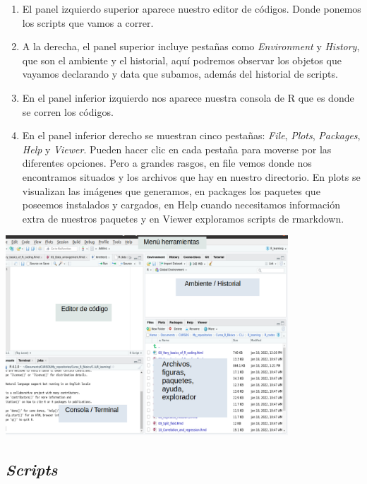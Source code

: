 \documentclass[
]{book}
\begin{document}
\begin{enumerate}
\def\labelenumi{\arabic{enumi}.}
\item
  El panel izquierdo superior aparece nuestro editor de códigos.
  Donde ponemos los scripts que vamos a correr.
\item
  A la derecha, el panel superior incluye pestañas como \emph{Environment} y \emph{History}, que son el ambiente y el historial, aquí podremos observar los objetos que vayamos declarando y data que subamos, además del historial de scripts.
\item
  En el panel inferior izquierdo nos aparece nuestra consola de R que es donde se corren los códigos.
\item
  En el panel inferior derecho se muestran cinco pestañas: \emph{File}, \emph{Plots}, \emph{Packages}, \emph{Help} y \emph{Viewer}.
  Pueden hacer clic en cada pestaña para moverse por las diferentes opciones.
  Pero a grandes rasgos, en file vemos donde nos encontramos situados y los archivos que hay en nuestro directorio.
  En plots se visualizan las imágenes que generamos, en packages los paquetes que poseemos instalados y cargados, en Help cuando necesitamos información extra de nuestros paquetes y en Viewer exploramos scripts de rmarkdown.
\end{enumerate}

\hfill\break

\begin{center}\includegraphics[width=300pt]{images/Consola2} \end{center}

\subsection{\texorpdfstring{\emph{Scripts}}{Scripts}}\label{scripts}
\end{document}
